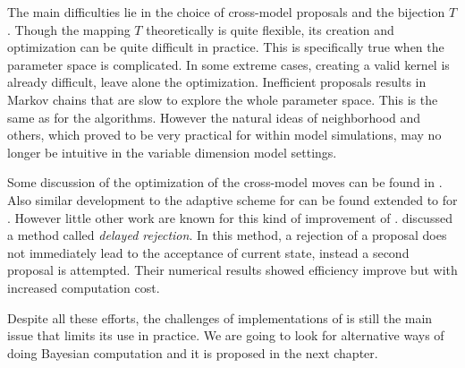 The main difficulties lie in the choice of cross-model proposals and the
bijection $T$. Though the mapping $T$ theoretically is quite flexible, its
creation and optimization can be quite difficult in practice. This is
specifically true when the parameter space is complicated. In some extreme
cases, creating a valid kernel is already difficult, leave alone the
optimization. Inefficient proposals results in Markov chains that are slow to
explore the whole parameter space. This is the same as for the \mcmc
algorithms. However the natural ideas of neighborhood and others, which proved
to be very practical for within model simulations, may no longer be intuitive
in the variable dimension model settings.

Some discussion of the optimization of the cross-model moves can be found in
\textcite{Green2009}. Also similar development to the adaptive scheme for \mha
can be found extended to for \rjmcmc \parencite[for example][]{Hastie2005}.
However little other work are known for this kind of improvement of \rjmcmc.
\textcite{Green2011} discussed a method called \emph{delayed rejection}. In
this method, a rejection of a proposal does not immediately lead to the
acceptance of current state, instead a second proposal is attempted. Their
numerical results showed efficiency improve but with increased computation
cost.

Despite all these efforts, the challenges of implementations of \rjmcmc is
still the main issue that limits its use in practice. We are going to look for
alternative ways of doing Bayesian computation and it is proposed in the next
chapter.
